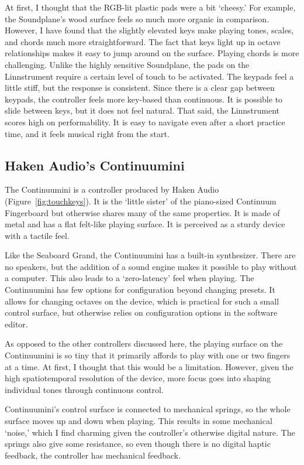 At first, I thought that the RGB-lit plastic pads were a bit `cheesy.' For example, the Soundplane's wood surface feels so much more organic in comparison. However, I have found that the slightly elevated keys make playing tones, scales, and chords much more straightforward. The fact that keys light up in octave relationships makes it easy to jump around on the surface. Playing chords is more challenging. Unlike the highly sensitive Soundplane, the pads on the Linnstrument require a certain level of touch to be activated. The keypads feel a little stiff, but the response is consistent. Since there is a clear gap between keypads, the controller feels more key-based than continuous. It is possible to slide between keys, but it does not feel natural. That said, the Linnstrument scores high on performability. It is easy to navigate even after a short practice time, and it feels musical right from the start.


\subsection{Haken Audio's Continuumini}

The Continuumini is a controller produced by Haken Audio (Figure~\ref{fig:touchkeys}). It is the `little sister' of the piano-sized Continuum Fingerboard but otherwise shares many of the same properties. It is made of metal and has a flat felt-like playing surface. It is perceived as a sturdy device with a tactile feel.

Like the Seaboard Grand, the Continuumini has a built-in synthesizer. There are no speakers, but the addition of a sound engine makes it possible to play without a computer. This also leads to a `zero-latency' feel when playing.
The Continuumini has few options for configuration beyond changing presets. It allows for changing octaves on the device, which is practical for such a small control surface, but otherwise relies on configuration options in the software editor.

As opposed to the other controllers discussed here, the playing surface on the Continuumini is so tiny that it primarily affords to play with one or two fingers at a time. At first, I thought that this would be a limitation. However, given the high spatiotemporal resolution of the device, more focus goes into shaping individual tones through continuous control.

Continuumini's control surface is connected to mechanical springs, so the whole surface moves up and down when playing. This results in some mechanical `noise,' which I find charming given the controller's otherwise digital nature. The springs also give some resistance, so even though there is no digital haptic feedback, the controller has mechanical feedback.

